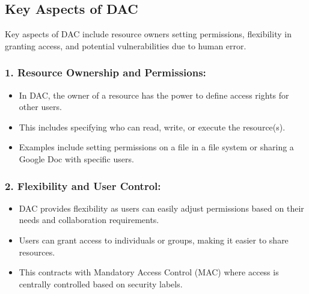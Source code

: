 \subsection{Key Aspects of DAC}
Key aspects of DAC include resource owners setting permissions, flexibility in granting access, and potential vulnerabilities due to human error.

\subsubsection{\textbf{1. Resource Ownership and Permissions:}}
\begin{itemize}
    \item In DAC, the owner of a resource has the power to define access rights for other users.
    \item This includes specifying who can read, write, or execute the resource(s).
    \item Examples include setting permissions on a file in a file system or sharing a Google Doc with specific users.
\end{itemize}
\subsubsection{\textbf{2. Flexibility and User Control:}}
\begin{itemize}
    \item DAC provides flexibility as users can easily adjust permissions based on their needs and collaboration requirements.
    \item Users can grant access to individuals or groups, making it easier to share resources.
    \item This contracts with Mandatory Access Control (MAC) where access is centrally controlled based on security labels.

\end{itemize}
